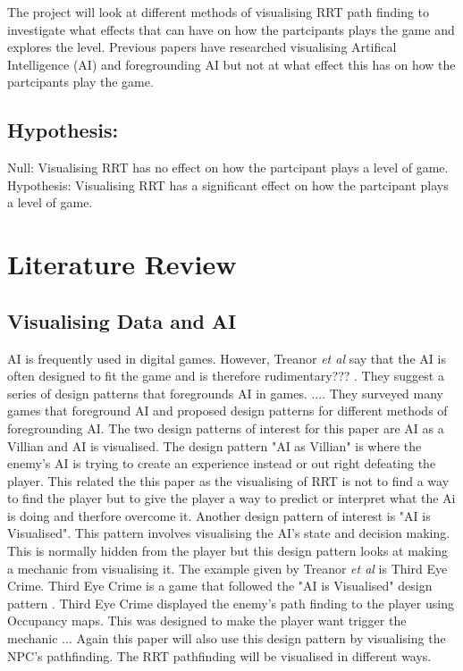 \documentclass[journal]{IEEEtran}
\begin{document}
The project will look at different methods of visualising RRT path finding to investigate what effects that can have on how the partcipants plays the game and explores the level.  Previous papers have researched visualising Artifical Intelligence (AI) and foregrounding AI but not at what effect this has on how the partcipants play the game.


\subsection{Hypothesis:}
Null: Visualising RRT has no effect on how the partcipant plays a level of game. \\
Hypothesis: Visualising RRT has a significant effect on how the partcipant plays a level of game. 


\section{Literature Review}
\subsection{Visualising Data and AI}
AI is frequently used in digital games. However, Treanor \textit{et al} say that the AI is often designed to fit the game and is therefore rudimentary??? \cite{treanor2015}. They suggest a series of design patterns that foregrounds AI in games. ....  
They surveyed many games that foreground AI and proposed design patterns for different methods of foregrounding AI. The two design patterns of interest for this paper are AI as a Villian and AI is visualised. The design pattern "AI as Villian" is where the enemy's AI is trying to create an experience instead or out right defeating the player. This related the this paper as the visualising of RRT is not to find a way to find the player but to give the player a way to predict or interpret what the Ai is doing and therfore overcome it.
Another design pattern of interest is "AI is Visualised". This pattern involves visualising the AI's state and decision making. This is normally hidden from the player but this design pattern looks at making a mechanic from visualising it. The example given by Treanor \textit{et al} is Third Eye Crime.  Third Eye Crime is a game that followed the "AI is Visualised" design pattern \cite{Isla2014}.  Third Eye Crime displayed the enemy's path finding to the player using Occupancy maps.  
This was designed to make the player want trigger the mechanic ...  Again this paper will also use this design pattern by visualising the NPC's pathfinding.  The RRT pathfinding will be visualised in different ways.
\end{document}
